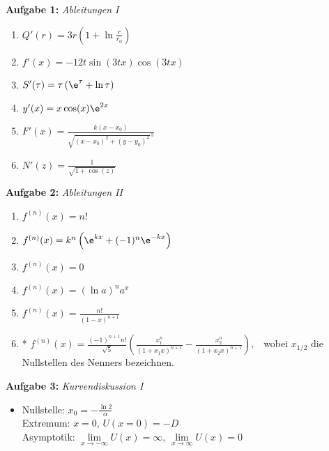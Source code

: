 
\textbf{Aufgabe 1: } \emph{Ableitungen I}
\begin{enumerate}[label=(\alph*)]
    \item $Q'(r)=3r\left(1+\ln\frac{r}{r_0}\right)$
    \item $f'(x)=-12t\sin(3tx)\cos(3tx)$
    \item $S'(\tau)=\tau\left(\e^{\tau}+\ln\tau\right)$
    \item $y'(x)=x\cos(x)\e^{2x}$
    \item $F'(x)=\frac{k(x-x_0)}{\sqrt{(x-x_0)^2+(y-y_0)^2}^{\ \!3}}$
    \item $N'(z)=\frac{1}{\sqrt{1+\cos(z)}}$
\end{enumerate}
\vspace{0.7cm}
%
\textbf{Aufgabe 2: } \emph{Ableitungen II}
\begin{enumerate}[label=(\alph*)]
    \item $f^{(n)}(x)=n!$
    \item $f^{(n)}(x)=k^n\left(\e^{kx}+(-1)^n\e^{-kx}\right)$
    \item $f^{(n)}(x)=0$
    \item $f^{(n)}(x)=\left(\ln a\right)^n a^x$
    \item $f^{(n)}(x)=\frac{n!}{(1-x)^{n+1}}$
    \item* $f^{(n)}(x)=\frac{(-1)^{n+1} n!}{\sqrt{5}}\left(\frac{x_1^n}{(1+x_1x)^{n+1}}-\frac{x_2^n}{(1+x_2x)^{n+1}}\right)$,\ \ wobei $x_{1/2}$ die Nullstellen des Nenners bezeichnen.
\end{enumerate}
\vspace{0.7cm}
%
\newpage
\textbf{Aufgabe 3: } \emph{Kurvendiskussion I}
\begin{itemize}
    \item Nullstelle: $x_0=-\frac{\ln 2}{\alpha}$\\[0.2cm]
    Extremum: $x=0$, $U(x=0)=-D$\\[0.2cm]
    Asymptotik: $\lim\limits_{x\rightarrow -\infty}U(x)=\infty$, $\lim\limits_{x\rightarrow \infty}U(x)=0$\\
\end{itemize}
\begin{figure}[htp]
    \centering
\end{figure}
